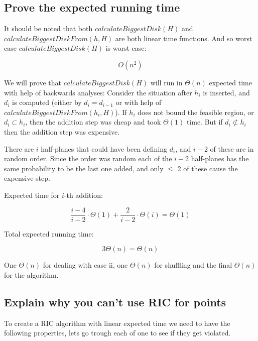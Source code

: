 \documentclass{article}
\begin{document}
\subsection{Prove the expected running time}
It should be noted that both $calculateBiggestDisk(H)$ and
$calculateBiggestDiskFrom(h,H)$ are both linear time functions.
And so worst case $calculateBiggestDisk(H)$ is worst case:

\[O(n^2)\]

We will prove that $calculateBiggestDisk(H)$ will run in $\Theta(n)$ expected
time with help of backwards analyses: Consider the situation after $h_i$ is
inserted, and $d_i$ is computed (either by $d_i = d_{i-1}$ or with help
of $calculateBiggestDiskFrom(h_i,H)$). If $h_i$ does not bound the feasible
region, or $d_i \subset h_i$, then the addition step was cheap
and took $\Theta(1)$ time. But if $d_i \not\subset h_i$ then the addition
step was expensive.

There are $i$ half-planes that could have been defining $d_i$, and $i-2$
of these are in random order. Since the order was random each of the $i-2$
half-planes has the same probability to be the last one added, and only
$\leq$ 2 of these cause the expensive step.

Expected time for $i$-th addition:

\[\frac{i-4}{i-2}\cdot\Theta(1)+\frac{2}{i-2}\cdot\Theta(i)=\Theta(1)\]

Total expected running time:

\[3\Theta(n) = \Theta(n)\]

One $\Theta(n)$ for dealing with case ii, one $\Theta(n)$ for shuffling and
the final $\Theta(n)$ for the algorithm.

\subsection{Explain why you can't use RIC for points}
To create a RIC algorithm with linear expected time we need to have the
following properties, lets go trough each of one to see if they get violated.
\end{document}
